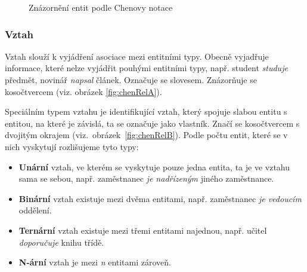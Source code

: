 \documentclass[czech,bachelor,public,dept460,male,oneside]{diploma}
\begin{document}
		\begin{figure}[H]
			\centering
			\caption[Znázornění entit podle Chenovy notace]{Znázornění entit podle Chenovy notace}
		\end{figure}

		\subsubsection{Vztah}
		Vztah slouží k vyjádření asociace mezi entitními typy. Obecně vyjadřuje informace, které nelze vyjádřit pouhými entitními typy, např. student \textit{studuje} předmět, novinář \textit{napsal} článek. Označuje se slovesem. Znázorňuje se kosočtvercem (viz. obrázek \ref{fig:chenRelA}). 
		
		Speciálním typem vztahu je identifikující vztah, který spojuje slabou entitu s entitou, na které je závislá, ta se označuje jako vlastník. Značí se kosočtvercem s dvojitým okrajem (viz.~obrázek~\ref{fig:chenRelB}). Podle počtu entit, které se v nich vyskytují rozlišujeme tyto typy:
		
		\begin{itemize}
			\item \textbf{Unární} vztah, ve kterém se vyskytuje pouze jedna entita, ta je ve vztahu sama se sebou, např. zaměstnanec \textit{je nadřízeným} jiného zaměstnance.
			\item \textbf{Binární} vztah existuje mezi dvěma entitami, např. zaměstnanec \textit{je vedoucím} oddělení.
			\item \textbf{Ternární} vztah existuje mezi třemi entitami najednou, např. učitel \textit{doporučuje} knihu třídě.
			\item \textbf{N-ární} vztah je mezi \textit{n} entitami zároveň.
		\end{itemize}
		
\end{document}
